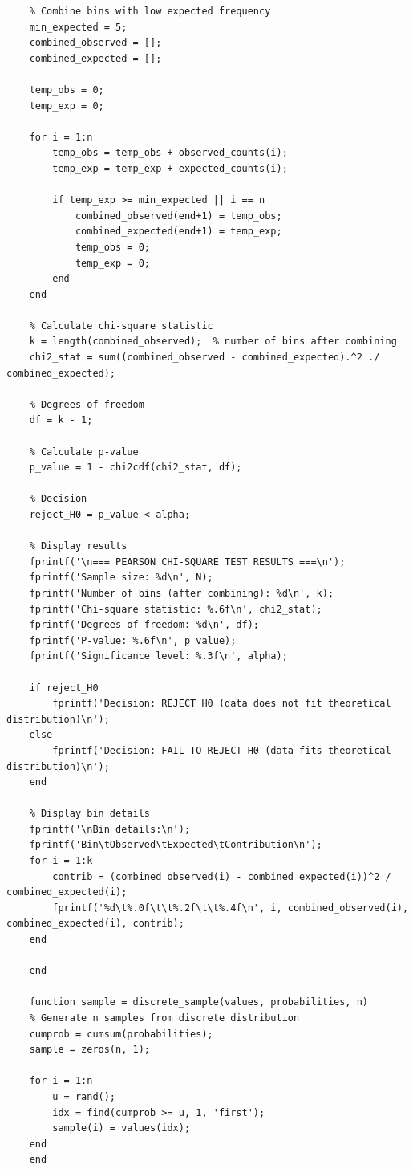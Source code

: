 \begin{matlab}
\begin{lstlisting}
    % Combine bins with low expected frequency
    min_expected = 5;
    combined_observed = [];
    combined_expected = [];
    
    temp_obs = 0;
    temp_exp = 0;
    
    for i = 1:n
        temp_obs = temp_obs + observed_counts(i);
        temp_exp = temp_exp + expected_counts(i);
        
        if temp_exp >= min_expected || i == n
            combined_observed(end+1) = temp_obs;
            combined_expected(end+1) = temp_exp;
            temp_obs = 0;
            temp_exp = 0;
        end
    end
    
    % Calculate chi-square statistic
    k = length(combined_observed);  % number of bins after combining
    chi2_stat = sum((combined_observed - combined_expected).^2 ./ combined_expected);
    
    % Degrees of freedom
    df = k - 1;
    
    % Calculate p-value
    p_value = 1 - chi2cdf(chi2_stat, df);
    
    % Decision
    reject_H0 = p_value < alpha;
    
    % Display results
    fprintf('\n=== PEARSON CHI-SQUARE TEST RESULTS ===\n');
    fprintf('Sample size: %d\n', N);
    fprintf('Number of bins (after combining): %d\n', k);
    fprintf('Chi-square statistic: %.6f\n', chi2_stat);
    fprintf('Degrees of freedom: %d\n', df);
    fprintf('P-value: %.6f\n', p_value);
    fprintf('Significance level: %.3f\n', alpha);
    
    if reject_H0
        fprintf('Decision: REJECT H0 (data does not fit theoretical distribution)\n');
    else
        fprintf('Decision: FAIL TO REJECT H0 (data fits theoretical distribution)\n');
    end
    
    % Display bin details
    fprintf('\nBin details:\n');
    fprintf('Bin\tObserved\tExpected\tContribution\n');
    for i = 1:k
        contrib = (combined_observed(i) - combined_expected(i))^2 / combined_expected(i);
        fprintf('%d\t%.0f\t\t%.2f\t\t%.4f\n', i, combined_observed(i), combined_expected(i), contrib);
    end
    
    end

    function sample = discrete_sample(values, probabilities, n)
    % Generate n samples from discrete distribution
    cumprob = cumsum(probabilities);
    sample = zeros(n, 1);
    
    for i = 1:n
        u = rand();
        idx = find(cumprob >= u, 1, 'first');
        sample(i) = values(idx);
    end
    end
    \end{lstlisting}
\end{matlab}

